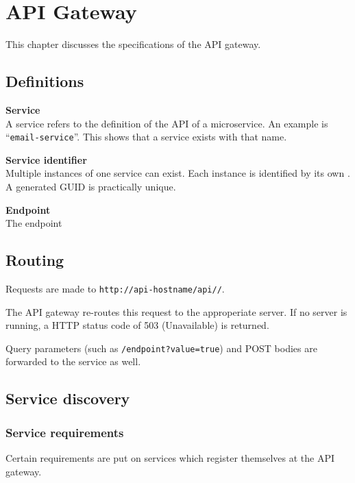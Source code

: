 \chapter{API Gateway}
This chapter discusses the specifications of the API gateway.

\section{Definitions}

\begin{teitemize}
    \item \textbf{Service}\\
    A service refers to the definition of the API of a microservice. An example is ``\texttt{email-service}''. This shows that a service exists with that name.
    \item \textbf{Service identifier}\\
    Multiple instances of one service can exist. Each instance is identified by its own . A generated GUID is practically unique.
    \item \textbf{Endpoint}\\
    The endpoint
\end{teitemize}
    
    \section{Routing}
Requests are made to \texttt{http://api-hostname/api/}\texttt{/}.

The API gateway re-routes this request to the approperiate server. If no server is running, a HTTP status code of 503 (Unavailable) is returned.

Query parameters (such as \texttt{/endpoint?value=true}) and POST bodies are forwarded to the service as well.

\section{Service discovery}
\subsection{Service requirements}
Certain requirements are put on services which register themselves at the API gateway.

